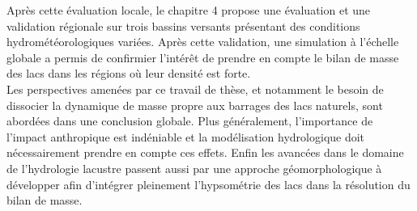 Après cette évaluation locale, le chapitre 4 propose une évaluation et une validation régionale sur trois bassins versants présentant des conditions hydrométéorologiques variées. Après cette validation, une simulation à l'échelle globale a permis de confirmier l'intérêt de prendre en compte le bilan de masse des lacs dans les régions où leur densité est forte.\\

Les perspectives amenées par ce travail de thèse, et notamment le besoin de dissocier la dynamique de masse propre aux barrages des lacs naturels, sont abordées dans une conclusion globale. Plus généralement, l'importance de l'impact anthropique est indéniable et la modélisation hydrologique doit nécessairement prendre en compte ces effets. Enfin les avancées dans le domaine de l'hydrologie lacustre passent aussi par une approche géomorphologique à développer afin d'intégrer pleinement l'hypsométrie des lacs dans la résolution du bilan de masse.
